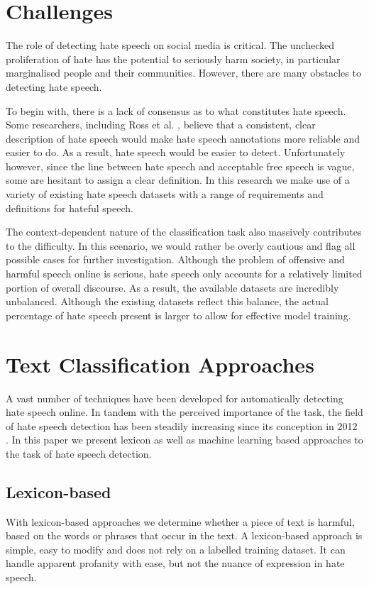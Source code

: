 \documentclass[a4paper,12pt]{report}
\begin{document}
	\section{Challenges}
	The role of detecting hate speech on social media is critical. The unchecked proliferation of hate has the potential to seriously harm society, in particular marginalised people and their communities. However, there are many obstacles to detecting hate speech. 
	
	To begin with, there is a lack of consensus as to what constitutes hate speech. Some researchers, including Ross et al. \cite{ross2017measuring}, believe that a consistent, clear description of hate speech would make hate speech annotations more reliable and easier to do. As a result, hate speech would be easier to detect. Unfortunately however, since the line between hate speech and acceptable free speech is vague, some are hesitant to assign a clear definition. In this research we make use of a variety of existing hate speech datasets with a range of requirements and definitions for hateful speech. 
	
	The context-dependent nature of the classification task also massively contributes to the difficulty. In this scenario, we would rather be overly cautious and flag all possible cases for further investigation. Although the problem of offensive and harmful speech online is serious, hate speech only accounts for a relatively limited portion of overall discourse. As a result, the available datasets are incredibly unbalanced. Although the existing datasets reflect this balance, the actual percentage of hate speech present is larger to allow for effective model training. 
	
	\section{Text Classification Approaches}
	A vast number of techniques have been developed for automatically detecting hate speech online. In tandem with the perceived importance of the task, the field of hate speech detection has been steadily increasing since its conception in 2012 \cite{warner2012detecting}. In this paper we present lexicon as well as machine learning based approaches to the task of hate speech detection.
	
	\subsection{Lexicon-based}
	With lexicon-based approaches we determine whether a piece of text is harmful, based on the words or phrases that occur in the text. A lexicon-based approach is simple, easy to modify and does not rely on a labelled training dataset. It can handle apparent profanity with ease, but not the nuance of expression in hate speech.
	
\end{document}
